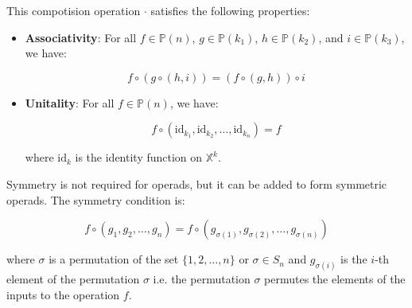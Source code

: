 This compotision operation $\cdot$ satisfies the following properties:

\begin{itemize}
  \item \textbf{Associativity}: For all $f \in \mathbb{P}(n)$, $g \in \mathbb{P}(k_1)$, $h \in \mathbb{P}(k_2)$, and $i \in \mathbb{P}(k_3)$, we have:

  \begin{equation}
    f \circ (g \circ (h, i)) = (f \circ (g, h)) \circ i
  \end{equation}

  \item \textbf{Unitality}: For all $f \in \mathbb{P}(n)$, we have:

  \begin{equation}
    f \circ (\text{id}_{k_1}, \text{id}_{k_2}, \ldots, \text{id}_{k_n}) = f
  \end{equation}

  where $\text{id}_k$ is the identity function on $\mathbb{X}^k$.
\end{itemize}

Symmetry is not required for operads, but it can be added to form symmetric operads. The symmetry condition is:

\begin{equation}
  f \circ (g_1, g_2, \ldots, g_n) = f \circ (g_{\sigma(1)}, g_{\sigma(2)}, \ldots, g_{\sigma(n)})
\end{equation}

where $\sigma$ is a permutation of the set $\{1, 2, \ldots, n\}$ or $\sigma \in S_n$ and $g_{\sigma(i)}$ is the $i$-th element of the permutation $\sigma$ i.e. the permutation $\sigma$ permutes the elements of the inputs to the operation $f$.
